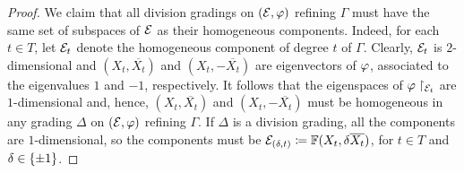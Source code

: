 \begin{proof}
	We claim that all division gradings on $(\mathcal E, \varphi)$ refining $\Gamma$ must have the same set of subspaces of $\mathcal E$ as their homogeneous components.
	Indeed, for each $t\in T$, let $\mathcal E_t$ denote the homogeneous component of degree $t$ of $\Gamma$.
	Clearly, $\mathcal E_t$ is $2$-dimensional and $(X_t, \overline{X_t})$ and $(X_t, -\overline{X_t})$ are eigenvectors of $\varphi$, associated to the eigenvalues $1$ and $-1$, respectively.
	It follows that the eigenspaces of $\varphi \restriction_{\mathcal E_t}$ are $1$-dimensional and, hence, $(X_t, \overline{X_t})$ and $(X_t, -\overline{X_t})$ must be homogeneous in any grading $\Delta$ on $(\mathcal E, \varphi)$ refining $\Gamma$.
	If $\Delta$ is a division grading, all the components are $1$-dimensional, so the components must be $\mathcal E_{(\delta, t)} \coloneqq \mathbb{F} (X_t, \delta \overline{X_t})$, for $t\in T$ and $\delta \in \{ \pm 1 \}$.




\end{proof}
